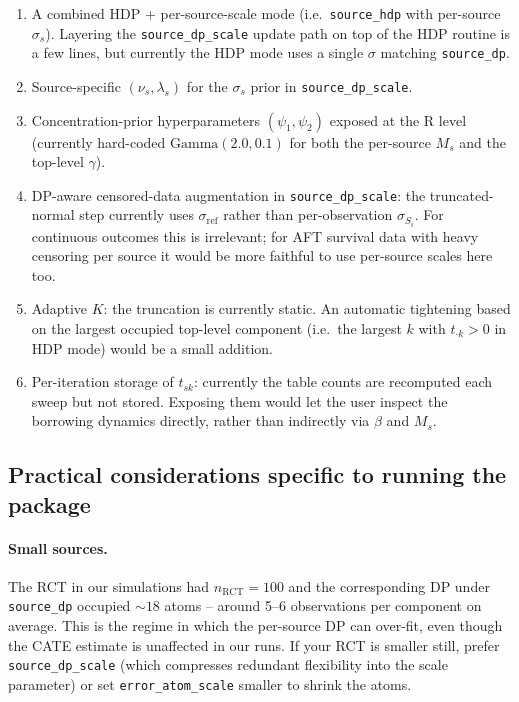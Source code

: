 \documentclass[11pt]{article}
\newcommand{\1}{\mathbf{1}}
\begin{document}
\begin{enumerate}[noitemsep]
  \item A combined HDP + per-source-scale mode (i.e.\ \texttt{source\_hdp} with per-source $\sigma_s$). Layering the \texttt{source\_dp\_scale} update path on top of the HDP routine is a few lines, but currently the HDP mode uses a single $\sigma$ matching \texttt{source\_dp}.
  \item Source-specific $(\nu_s, \lambda_s)$ for the $\sigma_s$ prior in \texttt{source\_dp\_scale}.
  \item Concentration-prior hyperparameters $(\psi_1, \psi_2)$ exposed at the R level (currently hard-coded $\mathrm{Gamma}(2.0, 0.1)$ for both the per-source $M_s$ and the top-level $\gamma$).
  \item DP-aware censored-data augmentation in \texttt{source\_dp\_scale}: the truncated-normal step currently uses $\sigma_\mathrm{ref}$ rather than per-observation $\sigma_{S_i}$. For continuous outcomes this is irrelevant; for AFT survival data with heavy censoring per source it would be more faithful to use per-source scales here too.
  \item Adaptive $K$: the truncation is currently static. An automatic tightening based on the largest occupied top-level component (i.e.\ the largest $k$ with $t_{\cdot k} > 0$ in HDP mode) would be a small addition.
  \item Per-iteration storage of $t_{sk}$: currently the table counts are recomputed each sweep but not stored. Exposing them would let the user inspect the borrowing dynamics directly, rather than indirectly via $\beta$ and $M_s$.
\end{enumerate}

\subsection{Practical considerations specific to running the package}

\paragraph{Small sources.} The RCT in our simulations had $n_\mathrm{RCT} = 100$ and the corresponding DP under \texttt{source\_dp} occupied $\sim 18$ atoms -- around 5--6 observations per component on average. This is the regime in which the per-source DP can over-fit, even though the CATE estimate is unaffected in our runs. If your RCT is smaller still, prefer \texttt{source\_dp\_scale} (which compresses redundant flexibility into the scale parameter) or set \texttt{error\_atom\_scale} smaller to shrink the atoms.
\end{document}
